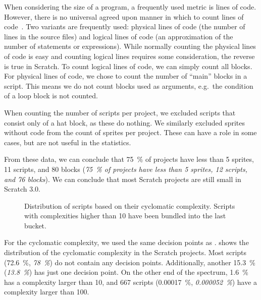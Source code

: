 \documentclass[../main]{subfiles}
\begin{document}
When considering the size of a program, a frequently used metric is lines of code.
However, there is no universal agreed upon manner in which to count lines of code~\autocite{nguyenSLOCCountingStandard2007}.
Two variants are frequently used: physical lines of code (the number of lines in the source files) and logical lines of code (an approximation of the number of statements or expressions).
While normally counting the physical lines of code is easy and counting logical lines requires some consideration, the reverse is true in Scratch.
To count logical lines of code, we can simply count all blocks.
For physical lines of code, we chose to count the number of ``main'' blocks in a script.
This means we do not count blocks used as arguments, e.g.\ the condition of a loop block is not counted.

When counting the number of scripts per project, we excluded scripts that consist only of a hat block, as these do nothing.
We similarly excluded sprites without code from the count of sprites per project.
These can have a role in some cases, but are not useful in the statistics.

From these data, we can conclude that \qty{75}{\percent} of projects have less than 5 sprites, 11 scripts, and 80 blocks (\textit{\qty{75}{\percent} of projects have less than 5 sprites, 12 scripts, and 76 blocks}).
We can conclude that most Scratch projects are still small in Scratch 3.0.

\begin{figure}
    \begin{wide}
        
    \end{wide}
    \caption{
        Distribution of scripts based on their cyclomatic complexity.
        Scripts with complexities higher than 10 have been bundled into the last bucket.
    }
    \label{fig:scratch-cc}
\end{figure}


For the cyclomatic complexity, we used the same decision points as \citeauthor{aivaloglouHowKidsCode2016}.
 shows the distribution of the cyclomatic complexity in the Scratch projects.
Most scripts (\qty{72.6}{\percent}, \textit{\qty{78}{\percent}}) do not contain any decision points.
Additionally, another \qty{15.3}{\percent} (\textit{\qty{13.8}{\percent}}) has just one decision point.
On the other end of the spectrum, \qty{1.6}{\percent} has a complexity larger than 10, and 667 scripts (\qty{0.00017}{\percent}, \textit{\qty{0.000052}{\percent}}) have a complexity larger than 100.
\end{document}
